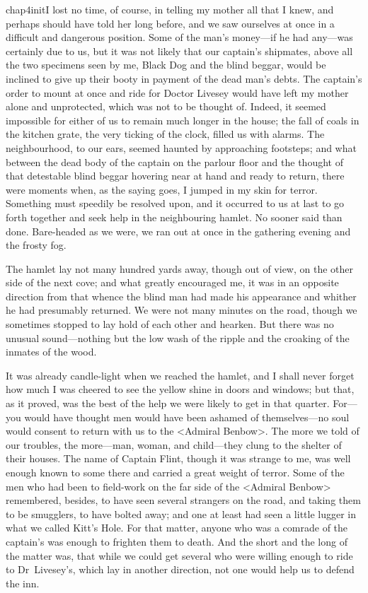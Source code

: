  
\lettrine{chap4initI}{} lost no time, of course, in telling my mother all that I knew, and perhaps should have told her long before, and we saw ourselves at once in a difficult and dangerous position. Some of the man's money—if he had any—was certainly due to us, but it was not likely that our captain's shipmates, above all the two specimens seen by me, Black Dog and the blind beggar, would be inclined to give up their booty in payment of the dead man's debts. The captain's order to mount at once and ride for Doctor Livesey would have left my mother alone and unprotected, which was not to be thought of. Indeed, it seemed impossible for either of us to remain much longer in the house; the fall of coals in the kitchen grate, the very ticking of the clock, filled us with alarms. The neighbourhood, to our ears, seemed haunted by approaching footsteps; and what between the dead body of the captain on the parlour floor and the thought of that detestable blind beggar hovering near at hand and ready to return, there were moments when, as the saying goes, I jumped in my skin for terror. Something must speedily be resolved upon, and it occurred to us at last to go forth together and seek help in the neighbouring hamlet. No sooner said than done. Bare-headed as we were, we ran out at once in the gathering evening and the frosty fog.

The hamlet lay not many hundred yards away, though out of view, on the other side of the next cove; and what greatly encouraged me, it was in an opposite direction from that whence the blind man had made his appearance and whither he had presumably returned. We were not many minutes on the road, though we sometimes stopped to lay hold of each other and hearken. But there was no unusual sound—nothing but the low wash of the ripple and the croaking of the inmates of the wood.

It was already candle-light when we reached the hamlet, and I shall never forget how much I was cheered to see the yellow shine in doors and windows; but that, as it proved, was the best of the help we were likely to get in that quarter. For—you would have thought men would have been ashamed of themselves—no soul would consent to return with us to the <Admiral Benbow>. The more we told of our troubles, the more—man, woman, and child—they clung to the shelter of their houses. The name of Captain Flint, though it was strange to me, was well enough known to some there and carried a great weight of terror. Some of the men who had been to field-work on the far side of the <Admiral Benbow> remembered, besides, to have seen several strangers on the road, and taking them to be smugglers, to have bolted away; and one at least had seen a little lugger in what we called Kitt's Hole. For that matter, anyone who was a comrade of the captain's was enough to frighten them to death. And the short and the long of the matter was, that while we could get several who were willing enough to ride to Dr~Livesey's, which lay in another direction, not one would help us to defend the inn.


